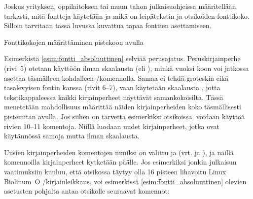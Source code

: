 Joskus yrityksen, oppilaitoksen tai muun tahon julkaisu\-ohjeissa
määritellään tarkasti, mitä fontteja käytetään ja mikä on leipätekstin
ja otsikoiden fonttikoko. Silloin tarvitaan tässä luvussa kuvattua tapaa
fonttien asettamiseen.

\begin{esimerkki}
\caption{Fonttikokojen määrittäminen pistekoon avulla}
\label{esim:fontti_absoluuttinen}
\end{esimerkki}

Esimerkistä \ref{esim:fontti_absoluuttinen} selviää perus\-ajatus.
Peruskirjainperhe (rivi~5) otetaan käyttöön ilman skaalausta (eli
), minkä vuoksi koon voi jatkossa asettaa täsmälleen
kohdalleen \-/komennolla. Samaa ei tehdä groteskin
eikä tasalevyisen fontin kanssa (rivit 6--7), vaan käytetään skaalausta
, jotta tekstikappaleessa kaikki kirjainperheet
näyttävät samankokoisilta. Tässä menetetään mahdollisuus määrittää
näiden kirjainperheiden koko täsmällisesti pistemitan avulla. Jos siihen
on tarvetta esimerkiksi otsikoissa, voidaan käyttää rivien 10--11
komentoja. Niillä luodaan uudet kirjainperheet, jotka ovat käytännössä
samoja mutta ilman skaalausta.

Uusien kirjainperheiden komentojen nimiksi on valittu  ja  (vrt. 
ja ), ja näillä komennoilla kirjainperheet
kytketään päälle. Jos esimerkiksi jonkin julkaisun vaatimuksiin kuuluu,
että otsikossa täytyy olla 16 pisteen lihavoitu Linux Biolinum~O
\=/kirjainleikkaus, voi esimerkissä \ref{esim:fontti_absoluuttinen}
olevien asetusten pohjalta antaa otsikolle seuraavat komennot:

